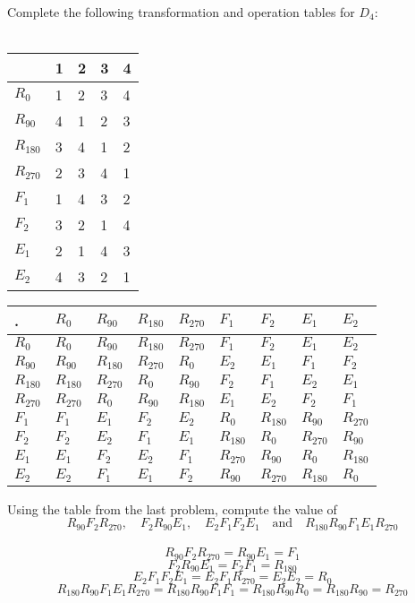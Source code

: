 \documentclass[titlepage]{article}
\newenvironment{problem}[2][Problem]{\begin{trivlist}
\item[\hskip \labelsep {\bfseries #1}\hskip \labelsep {\bfseries #2.}]}{\end{trivlist}}
\begin{document}
\begin{problem}{9}
Complete the following transformation and operation tables for $D_4$:
\\ \\
\begin{tabular}{lllll}
 & 1  & 2  & 3  & 4  \\\hline
$R_0$ & 1 & 2 & 3 & 4 \\
$R_{90}$ & 4 & 1 & 2 & 3 \\
$R_{180}$ & 3 & 4 & 1 & 2 \\
$R_{270}$& 2 & 3 & 4 & 1 \\
$F_1$ & 1 & 4 & 3 & 2 \\
$F_2$& 3 & 2 & 1 & 4 \\
$E_1$& 2 & 1 & 4 & 3 \\
$E_2$& 4 & 3 & 2 & 1
\end{tabular}
\end{problem}
\begin{tabular}{lllllllll}
. & $R_0$ & $R_{90}$ &$R_{180}$  &$R_{270}$ & $F_1$  &$F_2$  & $E_1$  & $E_2$  \\\hline
 $R_0$ & $R_0$  & $R_{90}$ &$R_{180}$  &$R_{270}$  		&$F_1$  &$F_2$  &$E_1$  &$E_2$  \\
$R_{90}$ & $R_{90}$ &$R_{180}$  &$R_{270}$  & $R_0$ 		&$E_2$  &$E_1$  &$F_1$  &$F_2$  \\
$R_{180}$ & $R_{180}$ &$R_{270}$  &$R_0$  & $R_{90}$ 	&$F_2$  &$F_1$  &$E_2$  & $E_1$  \\
$R_{270}$ &$R_{270}$  &$R_0$  &$R_{90}$  & $R_{180}$ 	&$E_1$  &$E_2$  &$F_2$  &$F_1$  \\
$F_1$ &$F_1$  &$E_1$  &$F_2$  &$E_2$  &$R_0$  &$R_{180}$  &$R_{90}$  &$R_{270}$  \\
$F_2$&$F_2$  &$E_2$  &$F_1$  &$E_1$  &$R_{180}$  &$R_0$  &$R_{270}$  &$R_{90}$  \\
$E_1$ &$E_1$  &$F_2$  &$E_2$  &$F_1$  &$R_{270}$  &$R_{90}$  &$R_0$  &$R_{180}$  \\
$E_2$ &$E_2$  & $F_1$ & $E_1$ &$F_2$  &$R_{90}$  &$R_{270}$  &$R_{180}$  &$R_0$ 
\end{tabular}
\begin{problem}{10}
Using the table from the last problem, compute the value of
$$R_{90}F_2R_{270}, \quad F_2R_{90}E_1, \quad E_2F_1F_2E_1 \quad \text{and}\quad R_{180}R_{90}F_1E_1R_{270}$$
\\
$$ R_{90}F_2R_{270}=R_{90}E_1 = F_1 $$ 
$$F_2R_{90}E_1= F_2F_1 = R_{180}$$
$$ E_2F_1F_2E_1 =E_2F_1R_{270}=E_2E_2 = R_0$$ 
$$ R_{180}R_{90}F_1E_1R_{270} =  R_{180}R_{90}F_1 F_1=  R_{180}R_{90}R_{0} = R_{180}R_{90}=R_{270}$$
\end{problem}
\end{document}
